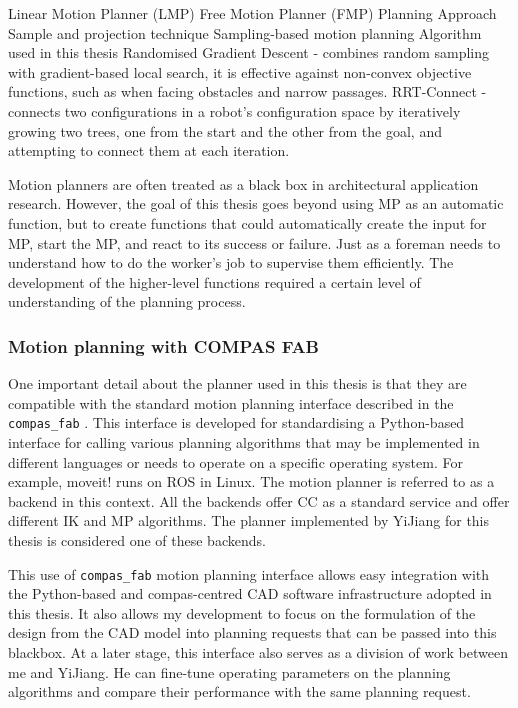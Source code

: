 Linear Motion Planner (LMP)
Free Motion Planner (FMP)
Planning Approach
Sample and projection technique
Sampling-based motion planning
Algorithm used in this thesis
Randomised Gradient Descent \parencite{yaoPathPlanningGeneral2007} - combines random sampling with gradient-based local search, it is effective against non-convex objective functions, such as when facing obstacles and narrow passages.
RRT-Connect \parencite{kuffnerjr.RRTConnectEfficientApproach2000} - connects two configurations in a robot's configuration space by iteratively growing two trees, one from the start and the other from the goal, and attempting to connect them at each iteration.

Motion planners are often treated as a black box in architectural application research. However, the goal of this thesis goes beyond using MP as an automatic function, but to create functions that could automatically create the input for MP, start the MP, and react to its success or failure. Just as a foreman needs to understand how to do the worker’s job to supervise them efficiently. The development of the higher-level functions required a certain level of understanding of the planning process.

\subsubsection{Motion planning with COMPAS FAB}


One important detail about the planner used in this thesis is that they are compatible with the standard motion planning interface described in the \verb|compas_fab| \parencite{rustCOMPASFABRobotic2018}. This interface is developed for standardising a Python-based interface for calling various planning algorithms that may be implemented in different languages or needs to operate on a specific operating system. For example, moveit! \parencite{sucanMoveit2018} runs on ROS \parencite{quigleyROSOpensourceRobot2009} in Linux. The motion planner is referred to as a backend in this context. All the backends offer CC as a standard service and offer different IK and MP algorithms. The planner implemented by YiJiang \parencite{huangCompas_fab_pychoreo2023} for this thesis is considered one of these backends. 

This use of \verb|compas_fab| motion planning interface allows easy integration with the Python-based and compas-centred CAD software infrastructure adopted in this thesis. It also allows my development to focus on the formulation of the design from the CAD model into planning requests that can be passed into this blackbox. At a later stage, this interface also serves as a division of work between me and YiJiang. He can fine-tune operating parameters on the planning algorithms and compare their performance with the same planning request.

